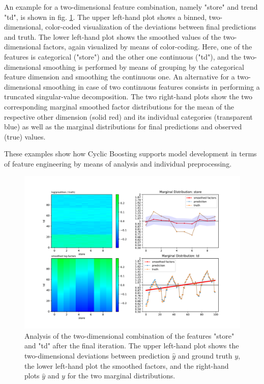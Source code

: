 \documentclass[BCOR=1mm, DIV=calc,10pt,
twoside=true,
twocolumn,
headings=normal]{scrartcl}
\begin{document}
An example for a two-dimensional feature combination, namely  "store" and trend "td", is
shown in fig. \ref{fig:store_td_2D}. The upper left-hand plot shows a binned,
two-dimensional, color-coded visualization of the deviations between final predictions
and truth. The lower left-hand plot shows the smoothed values of the two-dimensional
factors, again visualized by means of color-coding. Here, one of the features is
categorical ("store") and the other one continuous ("td"), and the two-dimensional
smoothing is performed by means of grouping by the categorical feature dimension and
smoothing the continuous one. An alternative for a two-dimensional smoothing in case of
two continuous features consists in performing a truncated singular-value decomposition.
The two right-hand plots show the two corresponding marginal smoothed factor distributions
for the mean of the respective other dimension (solid red) and its individual categories
(transparent blue) as well as the marginal distributions for final predictions and
observed (true) values.

These examples show how Cyclic Boosting supports model development in terms of feature
engineering by means of analysis and individual preprocessing.

\begin{figure}
\begin{center}
\includegraphics[scale=0.3]{store_td_2D}
\caption{\label{fig:store_td_2D} Analysis of the two-dimensional combination of the
features "store" and "td" after the final iteration. The upper left-hand plot shows the
two-dimensional deviations between prediction $\hat{y}$ and ground truth $y$, the lower
left-hand plot the smoothed factors, and the right-hand plots $\hat{y}$ and $y$ for the
two marginal distributions.}
\end{center}
\end{figure}
\end{document}
